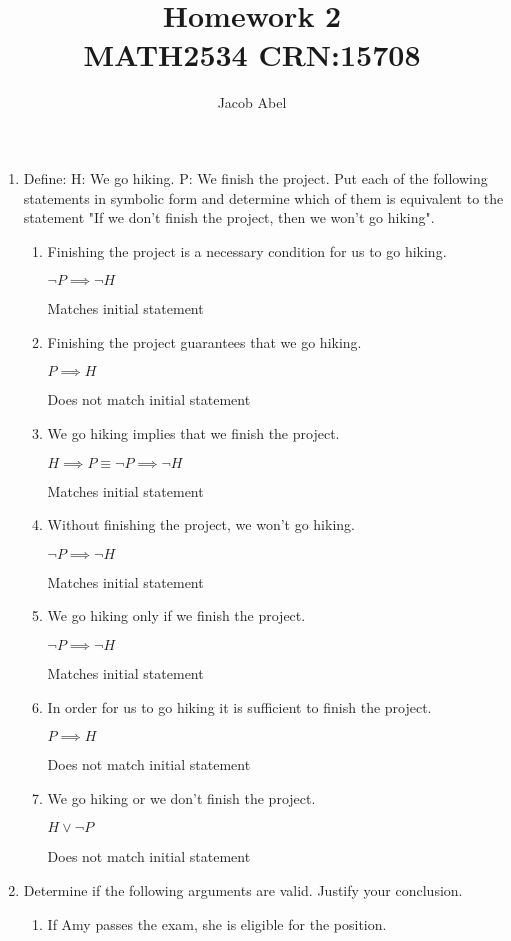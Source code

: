 \documentclass[12pt,letterpaper,titlepage]{article}
\author{Jacob Abel}
\title{	Homework 2
	\\\large MATH2534 CRN:15708
}
\begin{document}
\maketitle

\begin{raggedright}

\begin{enumerate}
\item Define: H: We go hiking. P: We finish the project. Put each of the following statements in symbolic form and determine which of them is equivalent to the statement "If we don't finish the project, then we won't go hiking".
\begin{enumerate}[label=(\alph*)]
\item Finishing the project is a necessary condition for us to go hiking.

$\neg P \implies \neg H$ 

Matches initial statement
\item Finishing the project guarantees that we go hiking.

$P \implies H$ 

Does not match initial statement
\item We go hiking implies that we finish the project.

$H \implies P \equiv \neg P \implies \neg H$ 

Matches initial statement
\item Without finishing the project, we won’t go hiking.

$\neg P \implies \neg H$ 

Matches initial statement
\item We go hiking only if we finish the project.

$\neg P \implies \neg H$ 

Matches initial statement
\item In order for us to go hiking it is sufficient to finish the project.

$P \implies H$ 

Does not match initial statement
\item We go hiking or we don’t finish the project.

$H \lor \neg P$

Does not match initial statement
\end{enumerate}

\pagebreak

\item Determine if the following arguments are valid. Justify your conclusion.
\begin{enumerate}[label=(\alph*)]
\item If Amy passes the exam, she is eligible for the position.


\end{enumerate}
\end{enumerate}
\end{raggedright}
\end{document}
